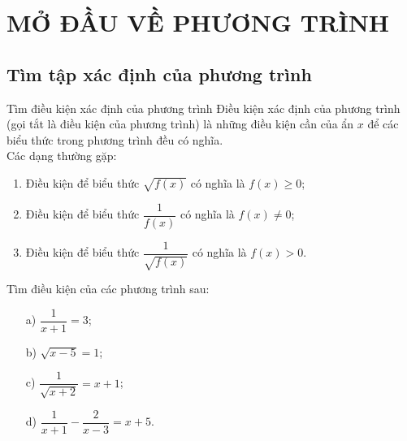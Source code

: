 \section{MỞ ĐẦU VỀ PHƯƠNG TRÌNH}
\subsection{Tìm tập xác định của phương trình}
\begin{dang}{Tìm điều kiện xác định của phương trình}
Điều kiện xác định của phương trình (gọi tắt là điều kiện của phương trình) là những điều kiện cần của ẩn $x$ để các biểu thức trong phương trình đều có nghĩa.\\
Các dạng thường gặp:
\begin{enumerate}
\item Điều kiện để biểu thức $\sqrt{f(x)}$ có nghĩa là $f(x)\geq 0$;
\item Điều kiện để biểu thức $\dfrac{1}{f(x)}$ có nghĩa là $f(x)\neq 0$;
\item Điều kiện để biểu thức $\dfrac{1}{\sqrt{f(x)}}$ có nghĩa là $f(x)>0$.
\end{enumerate}
\end{dang}
\begin{vd}%
Tìm điều kiện của các phương trình sau:
\begin{multicols}{2}
\begin{itemize}
\item [a)] $\dfrac{1}{x+1}=3$;
\item [b)] $\sqrt{x-5}=1$;
\item [c)] $\dfrac{1}{\sqrt{x+2}}=x+1$;
\item [d)] $\dfrac{1}{x+1}-\dfrac{2}{x-3}=x+5$.
\end{itemize}
\end{multicols}
\end{vd}

